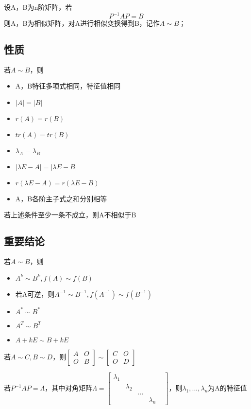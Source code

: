 设A，B为n阶矩阵，若
\[P^{-1}AP = B\]
则A，B为相似矩阵，对A进行相似变换得到B，记作\(A \sim B\)；

\subsection{性质}
若\(A \sim B\)，则
\begin{itemize}
    \item A，B特征多项式相同，特征值相同
    \item \(|A| = |B|\)
    \item \(r(A) = r(B)\)
    \item \(tr(A) = tr(B)\)
    \item \(\lambda_A = \lambda_B\)
    \item \(|\lambda E - A| = |\lambda E - B|\)
    \item \(r(\lambda E - A) = r(\lambda E - B)\)
    \item A，B各阶主子式之和分别相等
\end{itemize}
若上述条件至少一条不成立，则A不相似于B

\subsection{重要结论}
若\(A \sim B\)，则
\begin{itemize}
    \item \(A^k \sim B^k, f(A) \sim f(B)\)
    \item 若A可逆，则\(A^{-1} \sim B^{-1}, f(A^{-1}) \sim f(B^{-1})\)
    \item \(A^* \sim B^*\)
    \item \(A^T \sim B^T\)
    \item \(A + kE \sim B + kE\)
\end{itemize}

若\(A \sim C, B \sim D\)，则\(\begin{bmatrix}
    A & O \\ 
    O & B
\end{bmatrix} \sim \begin{bmatrix}
    C & O \\ 
    O & D
\end{bmatrix}\)

若\(P^{-1}AP = \Lambda\)，其中对角矩阵\(\Lambda = \begin{bmatrix}
\lambda_1 & & & & \\ 
& \lambda_2 & \\ 
& & ... \\ 
& & & \lambda_n
\end{bmatrix}\)，则\(\lambda_1, ..., \lambda_n\)为A的特征值


